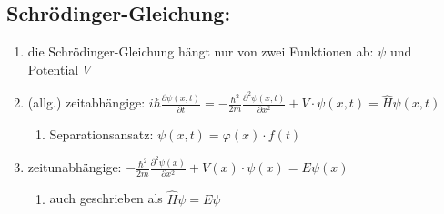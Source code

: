 \subsection{Schrödinger-Gleichung:}\label{schroedinger}
\begin{enumerate}
    \item die Schrödinger-Gleichung hängt nur von zwei Funktionen ab: $\psi$ und Potential $V$
    \item (allg.) zeitabhängige: $i\hbar\frac{\partial\psi\left(x,t\right)}{\partial t}=-\frac{\hbar^{2}}{2m}\frac{\partial^{2}\psi\left(x,t\right)}{\partial x^{2}}+V\cdot\psi\left(x,t\right)=\hat{H}\psi\left(x,t\right)$
    \begin{enumerate}
        \item Separationsansatz: $\psi(x,t)=\varphi(x)\cdot f(t)$
    \end{enumerate}


    \item zeitunabhängige: $-\frac{\hbar^{2}}{2m}\frac{\partial^{2}\psi\left(x\right)}{\partial x^{2}}+V(x)\cdot\psi\left(x\right)=E\psi\left(x\right)$ 
    \begin{enumerate}
        \item auch geschrieben als $\hat{H}\psi=E\psi$
    \end{enumerate}
\end{enumerate}
\newpage

